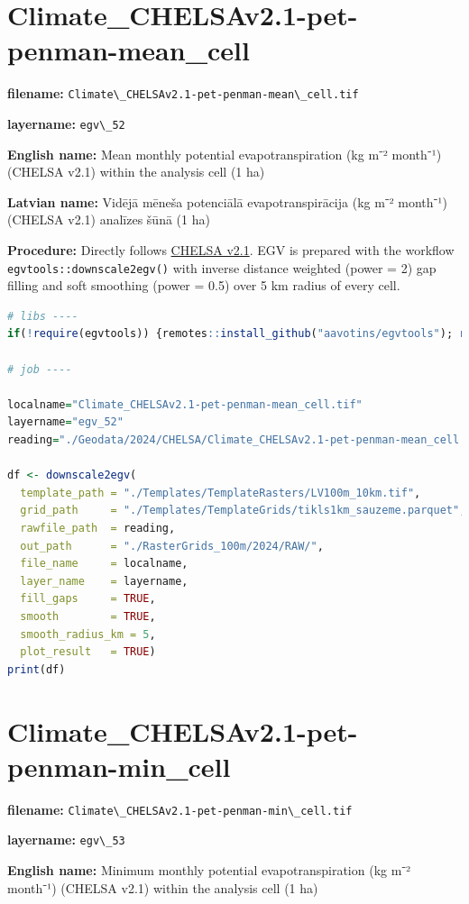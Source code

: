 \documentclass[
]{book}
\newcommand{\passthrough}[1]{#1}
\begin{document}
\section{Climate\_CHELSAv2.1-pet-penman-mean\_cell}\label{ch06.052}

\textbf{filename:} \passthrough{\lstinline!Climate\_CHELSAv2.1-pet-penman-mean\_cell.tif!}

\textbf{layername:} \passthrough{\lstinline!egv\_52!}

\textbf{English name:} Mean monthly potential evapotranspiration (kg m⁻² month⁻¹) (CHELSA v2.1) within the analysis cell (1 ha)

\textbf{Latvian name:} Vidējā mēneša potenciālā evapotranspirācija (kg m⁻² month⁻¹) (CHELSA v2.1) analīzes šūnā (1 ha)

\textbf{Procedure:} Directly follows \hyperref[Ch04.11]{CHELSA v2.1}. EGV is prepared with the
workflow \passthrough{\lstinline!egvtools::downscale2egv()!} with inverse distance weighted (power = 2)
gap filling and soft smoothing (power = 0.5) over 5 km radius of every cell.

\begin{lstlisting}[language=R]
# libs ----
if(!require(egvtools)) {remotes::install_github("aavotins/egvtools"); require(egvtools)}

# job ----

localname="Climate_CHELSAv2.1-pet-penman-mean_cell.tif"
layername="egv_52"
reading="./Geodata/2024/CHELSA/Climate_CHELSAv2.1-pet-penman-mean_cell.tif"

df <- downscale2egv(
  template_path = "./Templates/TemplateRasters/LV100m_10km.tif",
  grid_path     = "./Templates/TemplateGrids/tikls1km_sauzeme.parquet",
  rawfile_path  = reading,
  out_path      = "./RasterGrids_100m/2024/RAW/",
  file_name     = localname,
  layer_name    = layername,
  fill_gaps     = TRUE,
  smooth        = TRUE,
  smooth_radius_km = 5,
  plot_result   = TRUE)
print(df)
\end{lstlisting}

\section{Climate\_CHELSAv2.1-pet-penman-min\_cell}\label{ch06.053}

\textbf{filename:} \passthrough{\lstinline!Climate\_CHELSAv2.1-pet-penman-min\_cell.tif!}

\textbf{layername:} \passthrough{\lstinline!egv\_53!}

\textbf{English name:} Minimum monthly potential evapotranspiration (kg m⁻² month⁻¹) (CHELSA v2.1) within the analysis cell (1 ha)
\end{document}
